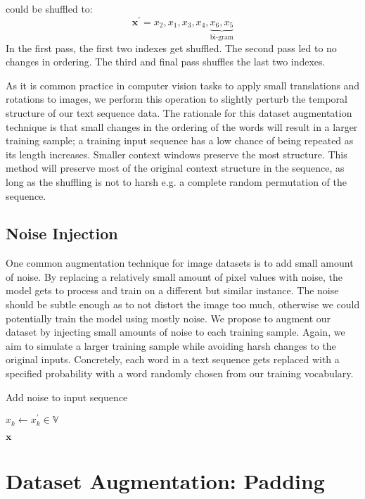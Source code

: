  could be shuffled to:
\[\bm{x}^{\prime} = x_2, x_1, x_3, x_4, \underbrace{x_6, x_5}_\text{bi-gram}\]
In the first pass, the first two indexes get shuffled. The second pass led to no changes in ordering. The third and
final pass shuffles the last two indexes.

As it is common practice in computer vision tasks to apply small translations and rotations to images, we perform
this operation to slightly perturb the temporal structure of our text sequence data.
The rationale for this dataset augmentation technique is that small changes in the ordering of the words will
result in a larger training sample; a training input sequence has a low chance of being repeated as its
length increases. Smaller context windows preserve the most structure. This method will preserve
most of the original context structure in the sequence, as long as the shuffling is not to harsh e.g.
a complete random permutation of the sequence.

\subsection{Noise Injection}
One common augmentation technique for image datasets is to add small amount of noise. By replacing a relatively small
amount of pixel values with noise, the model gets to process and train on a different but similar instance. The noise should be subtle
enough as to not distort the image too much, otherwise we could potentially train the model using mostly noise.
We propose to augment our dataset by injecting small amounts of noise to each training sample. Again, we aim to simulate
a larger training sample while avoiding harsh changes to the original inputs. Concretely, each word in a text sequence gets replaced
with a specified probability with a word randomly chosen from our training vocabulary.
\begin{algorithm}[H]
\caption{Add noise to input sequence}
\begin{algorithmic}[1]
\State$x_k \gets x^{\prime}_k \in \mathbb{V}$
\EndIf
\EndFor

\Return $\bm{x}$
\EndProcedure
\end{algorithmic}
\end{algorithm}


\section{Dataset Augmentation: Padding}

